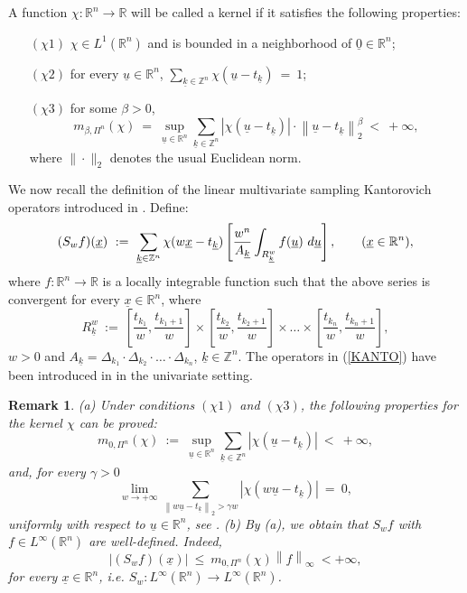 \documentclass[11pt,a4paper]{article}
\newcommand{\miu}{\leq}
\newcommand{\R}{\mathbb{R}}
\newcommand{\Z}{\mathbb{Z}}
\newcommand{\kk}{\underline{k}}
\newcommand{\tk}{t_{\underline{k}}}
\newcommand{\uu}{\underline{u}}
\newcommand{\xx}{\underline{x}}
\newtheorem{remark}[definition]{Remark}
\begin{document}
  A function $\chi: \R^n \to \R$ will be called a kernel if it satisfies the following properties:
\begin{itemize}
	\item[$(\chi1)$] $\chi \in L^1(\R^n)$ and is bounded in a neighborhood of $\underline{0} \in \R^n$; 
	\item[$(\chi 2)$] for every $\underline{u} \in \R^n$, \hskip0.2cm $\displaystyle \sum_{\underline{k} \in \Z^n} \chi(\underline{u} - t_{\underline{k}})\ =\ 1$;
	\item[$(\chi 3)$] for some $\beta>0$,
$$
m_{\beta, \Pi^n }(\chi)\ =\ \sup_{\underline{u} \in \R^n}\sum_{\underline{k} \in \Z^n}\left|\chi(\underline{u}-t_{\underline{k}})\right|\cdot \left\|\underline{u}-t_{\underline{k}}\right\|^{\beta}_2\ <\ +\infty,
$$
where $\| \cdot \|_2$ denotes the usual Euclidean norm. 
\end{itemize}
We now recall the definition of the linear multivariate sampling Kantorovich operators introduced in \cite{COVI}. Define:
\begin{equation} \label{KANTO}
(S_w f)(\underline{x})\ :=\ \sum_{\underline{k} \in \Z^n} \chi(w\underline{x}-t_{\underline{k}})\left[\frac{w^n}{A_{\underline{k}}} \int_{R_{\underline{k}}^w}f(\underline{u})\ d\underline{u}\right], \hskip0.7cm (\underline{x} \in \R^n),
\end{equation}
where $f: \R^n \to \R$ is a locally integrable function such that the above series is convergent for every $\underline{x} \in \R^n$, where
\begin{displaymath}
R_{\underline{k}}^w\ :=\ \left[\frac{t_{k_1}}{w},\frac{t_{k_1+1}}{w}\right]\times\left[\frac{t_{k_2}}{w},\frac{t_{k_2+1}}{w}\right]\times\dots \times\left[\frac{t_{k_n}}{w},\frac{t_{k_n+1}}{w}\right],
\end{displaymath}
$w>0$ and $A_{\underline{k}} = \Delta_{k_1} \cdot \Delta_{k_2} \cdot\dots \cdot \Delta_{k_n}$, $\underline{k} \in \Z^n$. The operators in (\ref{KANTO}) have been introduced in \cite{BABUSTVI} in the univariate setting.
\begin{remark} \label{remark1} \rm
(a) Under conditions $(\chi 1)$ and $(\chi 3)$, the following properties for the kernel $\chi$ can be proved:
$$
m_{0, \Pi^n}(\chi)\ :=\ \sup_{\uu \in \R^n} \sum_{\kk \in \Z^n} \left|\chi(\uu-\tk)\right|\ <\ +\infty,
$$
and, for every $\gamma >0$
\begin{equation} \label{eee}
\lim_{w \to +\infty} \sum_{\left\|w \uu-\tk\right\|_2 >\gamma w}\left|\chi(w \uu - \tk)\right|\ =\ 0,
\end{equation}
uniformly with respect to $\uu \in \R^n$, see \cite{COVI}.
\vskip0.2cm
\noindent (b) By (a), we obtain that $S_w f$ with $f \in L^{\infty}(\R^n)$ are well-defined. Indeed,
\begin{displaymath}
\left|(S_w f)(\xx)\right|\ \miu\ m_{0, \Pi^n}(\chi)\left\|f\right\|_{\infty}\ < +\infty,
\end{displaymath}
for every $\xx \in \R^n$, i.e. $S_w : L^{\infty}(\R^n)\rightarrow L^{\infty}(\R^n)$.
\end{remark}
\end{document}
